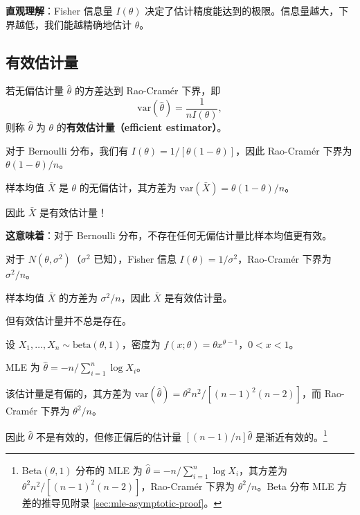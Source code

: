 \textbf{直观理解}：Fisher 信息量 $I(\theta)$ 决定了估计精度能达到的极限。信息量越大，下界越低，我们能越精确地估计 $\theta$。

\subsection{有效估计量}

\begin{definition}[有效估计量]\label{def:efficient-estimator}
若无偏估计量 $\widehat{\theta}$ 的方差达到 Rao-Cramér 下界，即
\[
\text{var}(\widehat{\theta}) = \frac{1}{n I(\theta)},
\]
则称 $\widehat{\theta}$ 为 $\theta$ 的\textbf{有效估计量（efficient estimator）}。
\end{definition}

\begin{example}\label{ex:bernoulli-efficient}
对于 Bernoulli 分布，我们有 $I(\theta) = 1/[\theta(1-\theta)]$，因此 Rao-Cramér 下界为 $\theta(1-\theta)/n$。

样本均值 $\bar{X}$ 是 $\theta$ 的无偏估计，其方差为 $\text{var}(\bar{X}) = \theta(1-\theta)/n$。

因此 $\bar{X}$ 是有效估计量！

\textbf{这意味着}：对于 Bernoulli 分布，不存在任何无偏估计量比样本均值更有效。
\end{example}

\begin{example}[正态分布的样本均值]\label{ex:normal-efficient}
对于 $N(\theta, \sigma^2)$（$\sigma^2$ 已知），Fisher 信息 $I(\theta) = 1/\sigma^2$，Rao-Cramér 下界为 $\sigma^2/n$。

样本均值 $\bar{X}$ 的方差为 $\sigma^2/n$，因此 $\bar{X}$ 是有效估计量。
\end{example}

但有效估计量并不总是存在。

\begin{example}\label{ex:beta-not-efficient}
设 $X_1, \ldots, X_n \sim \text{beta}(\theta, 1)$，密度为 $f(x;\theta) = \theta x^{\theta-1}$，$0 < x < 1$。

MLE 为 $\widehat{\theta} = -n / \sum_{i=1}^n \log X_i$。

该估计量是有偏的，其方差为 $\text{var}(\widehat{\theta}) = \theta^2 n^2 / [(n-1)^2(n-2)]$，而 Rao-Cramér 下界为 $\theta^2/n$。

因此 $\widehat{\theta}$ 不是有效的，但修正偏后的估计量 $[(n-1)/n]\widehat{\theta}$ 是渐近有效的。\footnote{Beta$(\theta,1)$ 分布的 MLE 为 $\widehat{\theta}=-n/\sum_{i=1}^n\log X_i$，其方差为 $\theta^2 n^2/[(n-1)^2(n-2)]$，Rao-Cramér 下界为 $\theta^2/n$。Beta 分布 MLE 方差的推导见附录 \cref{sec:mle-asymptotic-proof}。}
\end{example}

